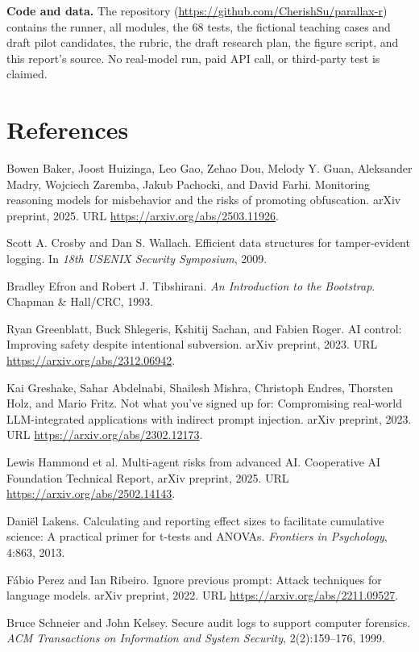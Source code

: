 \documentclass[11pt]{article}
\begin{document}
\textbf{Code and data.} The repository (\url{https://github.com/CherishSu/parallax-r}) contains the runner, all modules, the 68 tests, the fictional teaching cases and draft pilot candidates, the rubric, the draft research plan, the figure script, and this report's source. No real-model run, paid API call, or third-party test is claimed.

\section*{References}
\small
\begin{enumerate}[label={[\arabic*]},leftmargin=*,itemsep=3pt]
\item Bowen Baker, Joost Huizinga, Leo Gao, Zehao Dou, Melody Y. Guan, Aleksander Madry, Wojciech Zaremba, Jakub Pachocki, and David Farhi. Monitoring reasoning models for misbehavior and the risks of promoting obfuscation. arXiv preprint, 2025. URL \url{https://arxiv.org/abs/2503.11926}.
\item Scott A. Crosby and Dan S. Wallach. Efficient data structures for tamper-evident logging. In \emph{18th USENIX Security Symposium}, 2009.
\item Bradley Efron and Robert J. Tibshirani. \emph{An Introduction to the Bootstrap}. Chapman \& Hall/CRC, 1993.
\item Ryan Greenblatt, Buck Shlegeris, Kshitij Sachan, and Fabien Roger. AI control: Improving safety despite intentional subversion. arXiv preprint, 2023. URL \url{https://arxiv.org/abs/2312.06942}.
\item Kai Greshake, Sahar Abdelnabi, Shailesh Mishra, Christoph Endres, Thorsten Holz, and Mario Fritz. Not what you've signed up for: Compromising real-world LLM-integrated applications with indirect prompt injection. arXiv preprint, 2023. URL \url{https://arxiv.org/abs/2302.12173}.
\item Lewis Hammond et al. Multi-agent risks from advanced AI. Cooperative AI Foundation Technical Report, arXiv preprint, 2025. URL \url{https://arxiv.org/abs/2502.14143}.
\item Dani\"el Lakens. Calculating and reporting effect sizes to facilitate cumulative science: A practical primer for t-tests and ANOVAs. \emph{Frontiers in Psychology}, 4:863, 2013.
\item F\'abio Perez and Ian Ribeiro. Ignore previous prompt: Attack techniques for language models. arXiv preprint, 2022. URL \url{https://arxiv.org/abs/2211.09527}.
\item Bruce Schneier and John Kelsey. Secure audit logs to support computer forensics. \emph{ACM Transactions on Information and System Security}, 2(2):159--176, 1999.

\end{enumerate}
\end{document}
